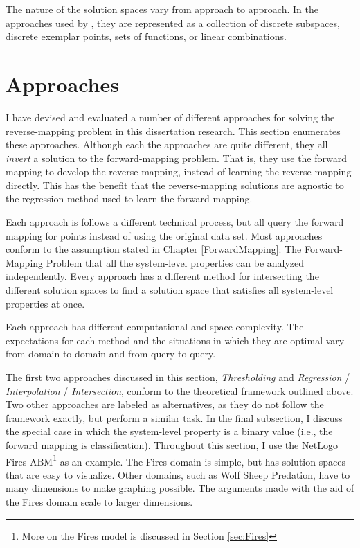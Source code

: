 The nature of the solution spaces vary from approach to approach.
In the approaches used by \fw, they are represented as a collection of discrete subspaces, discrete exemplar points, sets of functions, or linear combinations.


\section{Approaches}

I have devised and evaluated a number of different approaches for solving the reverse-mapping problem in this dissertation research.
This section enumerates these approaches.
Although each the approaches are quite different, they all \textit{invert} a solution to the forward-mapping problem.
That is, they use the forward mapping to develop the reverse mapping, instead of learning the reverse mapping directly.
This has the benefit that the reverse-mapping solutions are agnostic to the regression method used to learn the forward mapping.

Each approach is follows a different technical process, but all query the forward mapping for points instead of using the original data set.
Most approaches conform to the assumption stated in Chapter \ref{ForwardMapping}: The Forward-Mapping Problem that all the system-level properties can be analyzed independently.
Every approach has a different method for intersecting the different solution spaces to find a solution space that satisfies all system-level properties at once.

Each approach has different computational and space complexity.
The expectations for each method and the situations in which they are optimal vary from domain to domain and from query to query.

The first two approaches discussed in this section, \textit{Thresholding} and \textit{Regression} / \textit{Interpolation} / \textit{Intersection}, conform to the theoretical framework outlined above.
Two other approaches are labeled as alternatives, as they do not follow the framework exactly, but perform a similar task.
In the final subsection, I discuss the special case in which the system-level property is a binary value (i.e., the forward mapping is classification).
Throughout this section, I use the NetLogo Fires ABM\footnote{More on the Fires model is discussed in Section \ref{sec:Fires}} as an example.
The Fires domain is simple, but has solution spaces that are easy to visualize.
Other domains, such as Wolf Sheep Predation, have to many dimensions to make graphing possible.
The arguments made with the aid of the Fires domain scale to larger dimensions.

